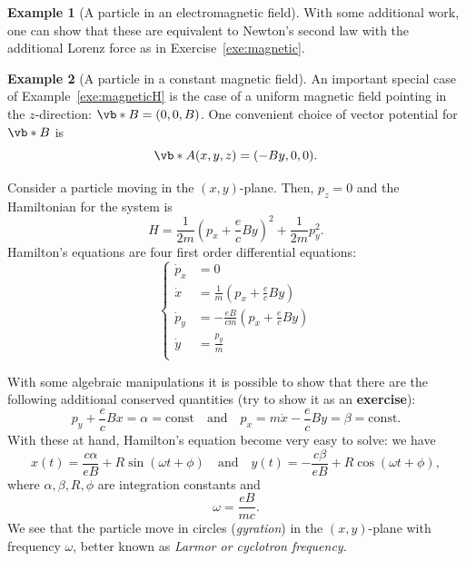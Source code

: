 \documentclass[english,fontsize=11pt,paper=b5]{scrbook}
\theoremstyle{definition}
\newtheorem{example}{Example}[chapter]
\begin{document}
\begin{example}[A particle in an electromagnetic field]
      With some additional work, one can show that these are equivalent to Newton's second law with the additional Lorenz force as in Exercise~\ref{exe:magnetic}.
    \end{example}

    \begin{example}[A particle in a constant magnetic field]
      An important special case of Example~\ref{exe:magneticH} is the case of a uniform magnetic field pointing in the $z$-direction: $\vb* B = (0,0,B)$.
      One convenient choice of vector potential for $\vb* B$ is
      \begin{equation}
        \vb* A (x,y,z) = (-B y, 0, 0).
      \end{equation}

      Consider a particle moving in the $(x, y)$-plane.
      Then, $p_z = 0$ and the Hamiltonian for the system is
      \begin{equation}
        H = \frac1{2m}\left(p_x + \frac ec By\right)^2 + \frac1{2m}p_y^2.
      \end{equation}
      Hamilton's equations are four first order differential equations:
      \begin{equation}\label{eq:magHeq}
        \left\lbrace
          \begin{aligned}
            \dot p_x & = 0                                             \\
            \dot x   & = \frac1m\left(p_x + \frac ec By\right)         \\
            \dot p_y & = -\frac{eB}{cm} \left(p_x + \frac ec By\right) \\
            \dot y   & = \frac {p_y} m                                 \\
          \end{aligned}
        \right.
      \end{equation}

      With some algebraic manipulations it is possible to show that there are the following additional conserved quantities (try to show it as an \textbf{exercise}):
      \begin{equation}
        p_y + \frac ec Bx = \alpha = \mathrm{const} \quad\mbox{and}\quad
        p_x = m\dot x - \frac ec By = \beta = \mathrm{const}.
      \end{equation}
      With these at hand, Hamilton's equation become very easy to solve: we have
      \begin{equation}
        x(t) = \frac {c \alpha}{e B} + R \sin(\omega t + \phi)
        \quad\mbox{and}\quad
        y(t) = -\frac {c \beta}{e B} + R \cos(\omega t + \phi),
      \end{equation}
      where $\alpha, \beta, R, \phi$ are integration constants and
      \begin{equation}
        \omega = \frac{e B}{m c}.
      \end{equation}
      We see that the particle move in circles (\emph{gyration}) in the $(x,y)$-plane with frequency $\omega$, better known as \emph{Larmor or cyclotron frequency}.


\end{example}
\end{document}
